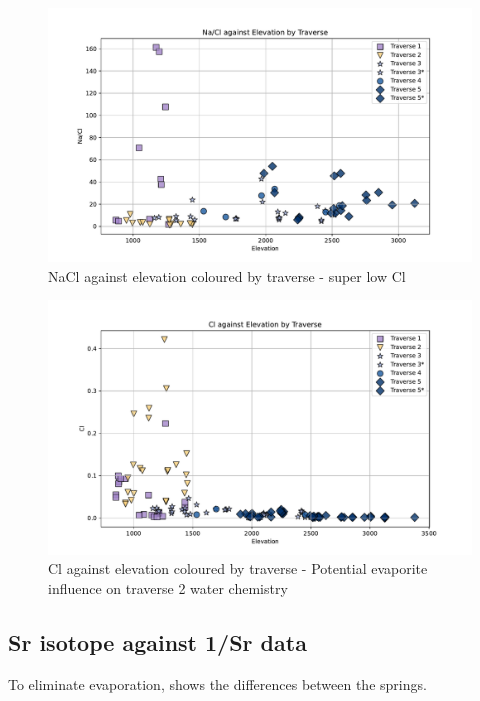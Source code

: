 \begin{figure}[h]
    \centering
    \includegraphics[width=\textwidth]{NaClEl.pdf}
    \caption{NaCl against elevation coloured by traverse -  super low Cl}
    \label{fig:spatial_changes_spring4}
\end{figure}

\FloatBarrier


\begin{figure}[h]
    \centering
    \includegraphics[width=\textwidth]{ClEl.pdf}
    \caption{Cl against elevation coloured by traverse - Potential evaporite influence on traverse 2 water chemistry}
    \label{fig:spatial_changes_spring5}
\end{figure}

\FloatBarrier



\subsection{Sr isotope against 1/Sr data}
To eliminate evaporation, shows the differences between the springs.

